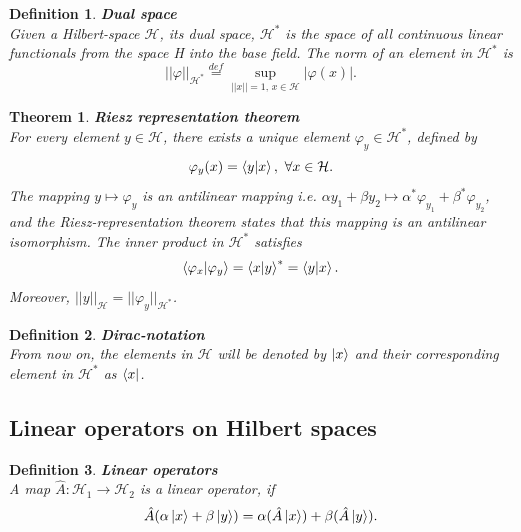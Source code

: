 \documentclass[12pt, a4paper,  nobibnotes]{article}
\newtheorem{theorem}{Theorem}
\newtheorem{definition}{Definition}
\begin{document}
\begin{definition}
    \textbf{Dual space}\\
    Given a Hilbert-space $\mathcal H$, its dual space, $\mathcal H^*$ is the space of all continuous linear
    functionals from the space H into the base field.
    The norm of an element in $\mathcal H^*$ is 
    \begin{equation*}
        ||\varphi||_{\mathcal H^*} \overset{def}{=} \underset{||x||=1,\, x \in \mathcal H}{\sup} |\varphi(x)|.
    \end{equation*}
\end{definition}

\begin{theorem}
    \textbf{Riesz representation theorem}\\
    For every element $y \in \mathcal H$, there exists a unique element $\varphi_{y} \in \mathcal H^*$, defined by
    \begin{equation*}
        \varphi_{y}(x) = \braket{y| x},~\forall x \in \mathcal H.
    \end{equation*}
    The mapping $y \mapsto \varphi_{y}$ is an antilinear mapping i.e. $\alpha y_1 + \beta y_2 
    \mapsto \alpha^* \varphi_{y_1} + \beta^* \varphi_{y_2}$, and the Riesz-representation theorem states 
    that this mapping is an antilinear isomorphism. The inner product in $\mathcal H^*$ satisfies 
    \begin{equation*}
        \braket{\varphi_{x}|\varphi_{y}} = \braket{x|y}^* = \braket{y | x}.
    \end{equation*}
    Moreover, $||y||_{\mathcal H} = ||\varphi_{y}||_{\mathcal H^*}$.
\end{theorem}

\begin{definition}
    \textbf{Dirac-notation}\\
    From now on, the elements in $\mathcal H$ will be denoted by $\ket x$ and their corresponding
    element in $\mathcal H^*$ as $\bra x$.
\end{definition}

\subsection{Linear operators on Hilbert spaces}

\begin{definition}
    \textbf{Linear operators}\\
    A map $\hat A: \mathcal H_1 \rightarrow \mathcal H_2$ is a linear operator, if 
    \begin{equation*}
        \hat A (\alpha\ket x + \beta\ket y) = \alpha (\hat A \ket x) + \beta (\hat A \ket y).
    \end{equation*}
\end{definition}
\end{document}
